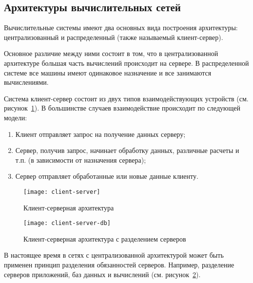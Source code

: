 \subsection{Архитектуры вычислительных сетей}

Вычислительные системы имеют два основных вида построения архитектуры: централизованный
и распределенный (также называемый клиент-сервер).

Основное различие между ними состоит в том, что в централизованной архитектуре большая
часть вычислений происходит на сервере. В распределенной системе все машины имеют
одинаковое назначение и все занимаются вычислениями.

Система клиент-сервер состоит из двух типов взаимодействующих устройств (см.
рисунок~\ref{pic:client-server}).
В большинстве случаев взаимодействие происходит по следующей модели:

\begin{enumerate}
    \item Клиент отправляет запрос на получение данных серверу;
    \item Сервер, получив запрос, начинает обработку данных, различные расчеты и т.п.
        (в зависимости от назначения сервера);
    \item Сервер отправляет обработанные или новые данные клиенту.
\end{enumerate}

\begin{figure}[h]
    \center
    \texttt{[image: client-server]}
    \caption{Клиент-серверная архитектура}
    \label{pic:client-server}
\end{figure}

\begin{figure}[h]
    \center
    \texttt{[image: client-server-db]}
    \caption{Клиент-серверная архитектура с разделением серверов}
    \label{pic:client-server-db}
\end{figure}

В настоящее время в сетях с централизованной архитектурой может быть применен принцип
разделения обязанностей серверов. Например, разделение серверов приложений, баз данных и
вычислений (см. рисунок~\ref{pic:client-server-db}).

